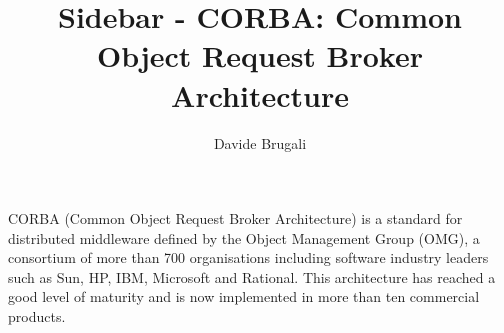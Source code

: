 %
%
%
%









%

\title*{Sidebar - CORBA: Common Object Request Broker Architecture}
\author{Davide Brugali}
%
%
\maketitle

CORBA (Common Object Request Broker Architecture) is a standard
for distributed middleware defined by the Object Management Group
(OMG), a consortium of more than 700 organisations including
software industry leaders such as Sun, HP, IBM, Microsoft and
Rational. This architecture has reached a good level of maturity
and is now implemented in more than ten commercial products.

